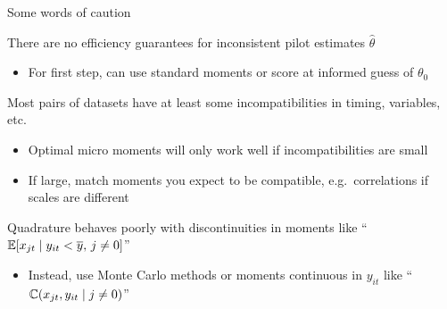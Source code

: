 \begin{frame}{Some words of caution}
    \begin{wideitemize}
        \item There are no efficiency guarantees for \alert{inconsistent} pilot estimates $\hat{\theta}$
        \begin{itemize}
            \item For first step, can use standard moments or score at informed guess of $\theta_0$
        \end{itemize}
        
        \item Most pairs of datasets have at least some  \alert{incompatibilities} in timing, variables, etc.
        \begin{itemize}
            \item Optimal micro moments will only work well if incompatibilities are small
            \item If large, match moments you expect to be compatible, e.g.\ correlations if scales are different
        \end{itemize}
    
        \item Quadrature behaves poorly with \alert{discontinuities} in moments like ``$\mathbb{E}[x_{jt} \mid y_{it} < \overline{y}, \, j \neq 0]$''
        \begin{itemize}
            \item Instead, use Monte Carlo methods or moments continuous in $y_{it}$ like ``$\mathbb{C}(x_{jt}, y_{it} \mid j \neq 0)$''
        \end{itemize}
    \end{wideitemize}
\end{frame}


